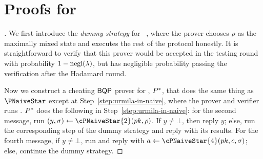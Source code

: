 \section{Proofs for }
\label{sec:qpip0_proof}

\begin{proof}[]
	We first introduce the \emph{dummy strategy} for ~, where the prover chooses $\rho$ as the maximally mixed state and executes the rest of the protocol honestly.
	It is straightforward to verify that this prover would be accepted in the testing round with probability $1-\operatorname{negl}(\lambda)$,
	but has negligible probability passing the verification  after the Hadamard round.

  
	Now we construct a cheating $\operatorname{\mathsf{BQP}}$ prover for , $P^*$, that does the same thing as $\PNaiveStar$ except at Step~\ref{step:urmila-in-naive}, where the prover and verifier runs . $P^*$ does the following in Step~\ref{step:urmila-in-naive}:
	for the second message, run $(y, \sigma)\leftarrow\cPNaiveStar{2}(pk, \rho)$.
	If $y\ne\bot$, then reply $y$;
	else, run the corresponding step of the dummy strategy and reply with its results.
	For the fourth message, if $y\ne\bot$, run and reply with $a\leftarrow\cPNaiveStar{4}(pk, c, \sigma)$;
	else, continue the dummy strategy.





\end{proof}
